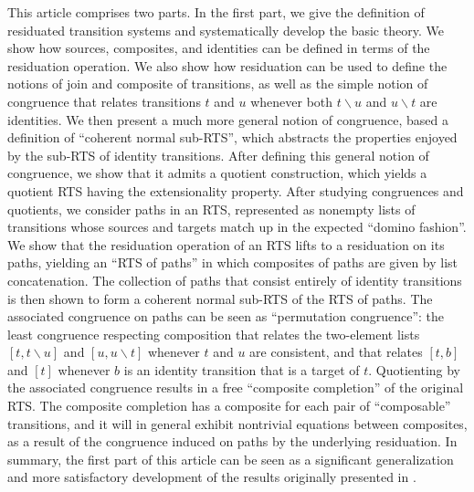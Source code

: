 \documentclass[11pt,notitlepage,a4paper]{report}
\newcommand\after{\backslash}
\begin{document}
This article comprises two parts.  In the first part, we give the definition of
residuated transition systems and systematically develop the basic theory.
We show how sources, composites, and identities can be defined in terms of the residuation
operation.  We also show how residuation can be used to define the notions of join
and composite of transitions, as well as the simple notion of congruence that relates
transitions $t$ and $u$ whenever both $t \after u$ and $u \after t$ are identities.
We then present a much more general notion of congruence, based a definition of
``coherent normal sub-RTS'', which abstracts the properties enjoyed by the sub-RTS of
identity transitions.  After defining this general notion of congruence, we show that
it admits a quotient construction, which yields a quotient RTS having the extensionality
property.
After studying congruences and quotients, we consider paths in an RTS, represented
as nonempty lists of transitions whose sources and targets match up in the expected
``domino fashion''.
We show that the residuation operation of an RTS lifts to a residuation on its paths,
yielding an ``RTS of paths'' in which composites of paths are given by list concatenation.
The collection of paths that consist entirely of identity transitions is then shown to form
a coherent normal sub-RTS of the RTS of paths.  The associated congruence on paths
can be seen as ``permutation congruence'': the least congruence respecting composition
that relates the two-element lists $[t, t\after u]$ and $[u, u\after t]$ whenever
$t$ and $u$ are consistent, and that relates $[t, b]$ and $[t]$ whenever $b$ is an
identity transition that is a target of $t$.
Quotienting by the associated congruence results in a free ``composite completion'' of
the original RTS.  The composite completion has a composite for each pair of ``composable''
transitions, and it will in general exhibit nontrivial equations between composites,
as a result of the congruence induced on paths by the underlying residuation.
In summary, the first part of this article can be seen as a significant generalization
and more satisfactory development of the results originally presented in \cite{cts}.
\end{document}
